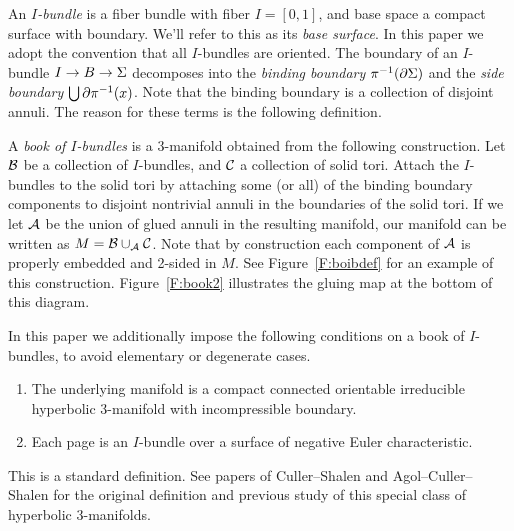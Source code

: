 \begin{defn}\label{D:boib}

An \emph{$I$-bundle} is a fiber bundle with fiber $I=[0,1]$, and base space
a compact surface with boundary. We'll refer to this as its \emph{base
surface}.  In this paper we adopt the convention that all $I$-bundles are
oriented.  The boundary of an $I$-bundle $I \to B \to \Sigma$ decomposes into the
\emph{binding boundary} $\pi^{-1}(\partial \Sigma)$ and the \emph{side boundary}
$\bigcup \partial \pi^{-1}(x)$. Note that the binding boundary is a collection of
disjoint annuli. The reason for these terms is the following definition.

A \emph{book of $I$-bundles} is a $3$-manifold obtained from the following
construction. Let $\mathcal{B}$ be a collection of $I$-bundles, and $\mathcal{C}$ a collection
of solid tori. Attach the $I$-bundles to the solid tori by attaching some (or
all) of the binding boundary components to disjoint nontrivial annuli in the
boundaries of the solid tori.  If we let $\mathcal{A}$ be the union of glued annuli in
the resulting manifold, our manifold can be written as $M=\mathcal{B} \cup_{\mathcal{A}} \mathcal{C}$.
Note that by construction each component of $\mathcal{A}$ is properly embedded and
2-sided in $M$. See Figure~\ref{F:boibdef} for an example of this construction.
Figure~\ref{F:book2} illustrates the gluing map at the bottom of this diagram.



In this paper we additionally impose the following conditions on a book of
$I$-bundles, to avoid elementary or degenerate cases.

\begin{enumerate}

\item The underlying manifold is a compact connected orientable irreducible
hyperbolic $3$-manifold with incompressible boundary.

\item Each page is an $I$-bundle over a surface of negative Euler
characteristic.

\end{enumerate}

\end{defn}

This is a standard definition. See papers of Culler--Shalen \cite[pp286]{CS}
and Agol--Culler--Shalen \cite[Definition 2.1]{ACS} for the original definition
and previous study of this special class of hyperbolic $3$-manifolds.

